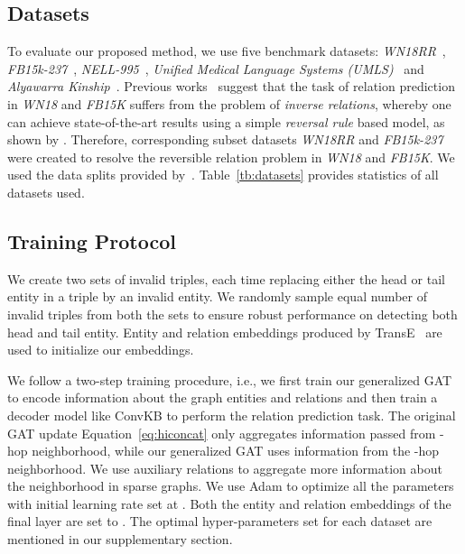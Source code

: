 \documentclass[11pt,a4paper]{article}
\begin{document}
\subsection{Datasets}
\label{ssec:datasets}
To evaluate our proposed method, we use five benchmark datasets: \emph{WN18RR}~\cite{dettmers2018convolutional}, 
 \emph{FB15k-237}~\cite{toutanova2015representing}, \emph{NELL-995}~\cite{xiong2017}, \emph{Unified Medical 
 Language Systems (UMLS)}~\cite{Kok:2007:SPI:1273496.1273551} and \emph{Alyawarra Kinship}~\cite{LinRX2018}. Previous works~\cite{toutanova2015representing,dettmers2018convolutional} suggest that the task of relation prediction in 
\emph{WN18} and \emph{FB15K} suffers from the problem of \emph{inverse relations}, whereby one can achieve state-of-the-art results using a simple \emph{reversal rule} 
based model, as shown by \cite{dettmers2018convolutional}. Therefore, corresponding subset datasets
 \emph{WN18RR} and \emph{FB15k-237} were created to resolve the reversible relation problem in \emph{WN18} and \emph{FB15K}. We used the data splits provided by~\cite{nguyen2018novel}. Table~\ref{tb:datasets} provides statistics of all datasets used.

\subsection{Training Protocol}
\label{ssec:training}
We create two sets of invalid triples, each time replacing either the head or tail entity in a triple by an invalid entity. 
We randomly sample equal number of invalid triples from both the sets to ensure robust performance on detecting both head and tail entity. Entity and relation embeddings produced by TransE~\cite{NIPS2013_5071,nguyen2018novel} are used to initialize our embeddings.


We follow a two-step training procedure, i.e., we first train our generalized GAT to encode information about the graph entities and relations and then train a decoder model like ConvKB \cite{nguyen2018novel} to perform the relation prediction task. The original GAT update Equation~\ref{eq:hiconcat} only aggregates information passed from -hop neighborhood, while our generalized GAT uses information from the  -hop neighborhood. We use auxiliary relations to aggregate more information about the neighborhood in sparse graphs. We use Adam to optimize all the parameters with initial learning rate set at . Both the entity and relation embeddings of the final layer are set to . The optimal hyper-parameters set for each dataset are mentioned in our supplementary section.
\end{document}

